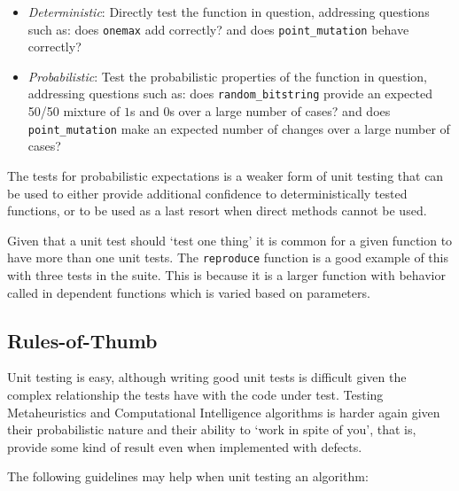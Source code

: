 \begin{itemize}
	\item \emph{Deterministic}: Directly test the function in question, addressing questions such as: does \texttt{onemax} add correctly? and does \texttt{point\_mutation} behave correctly?
	\item \emph{Probabilistic}: Test the probabilistic properties of the function in question, addressing questions such as: does \texttt{random\_bitstring} provide an expected 50/50 mixture of $1$s and $0$s over a large number of cases? and does \texttt{point\_mutation} make an expected number of changes over a large number of cases?
\end{itemize}

The tests for probabilistic expectations is a weaker form of unit testing that can be used to either provide additional confidence to deterministically tested functions, or to be used as a last resort when direct methods cannot be used.

Given that a unit test should `test one thing' it is common for a given function to have more than one unit tests. The \texttt{reproduce} function is a good example of this with three tests in the suite. This is because it is a larger function with behavior called in dependent functions which is varied based on parameters.



%
%
\subsection{Rules-of-Thumb}
\label{sec:suggestions}
Unit testing is easy, although writing good unit tests is difficult given the complex relationship the tests have with the code under test. Testing Metaheuristics and Computational Intelligence algorithms is harder again given their probabilistic nature and their ability to `work in spite of you', that is, provide some kind of result even when implemented with defects.

The following guidelines may help when unit testing an algorithm:

